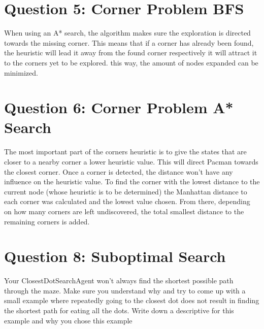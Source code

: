 \documentclass[onecolumn]{article}
\begin{document}
	\section{Question 5: Corner Problem BFS}
	When using an A* search, the algorithm makes sure the exploration is directed towards the missing corner. This means that if a corner has already been found, the heuristic will lead it away from the found corner respectively it will attract it to the corners yet to be explored. this way, the amount of nodes expanded can be minimized.
	
		
	\section{Question 6: Corner Problem A* Search}	
	The most important part of the corners heuristic is to give the states that are closer to a nearby corner a lower heuristic value. This will direct Pacman towards the closest corner. Once a corner is detected, the distance won't have any influence on the heuristic value. To find the corner with the lowest distance to the current node (whose heuristic is to be determined) the Manhattan distance to each corner was calculated and the lowest value chosen. From there, depending on how many corners are left undiscovered, the total smallest distance to the remaining corners is added.
	
	\section{Question 8: Suboptimal Search}
	Your ClosestDotSearchAgent won’t always find the shortest possible path through the maze. Make sure you understand why and try to come up with a small example where repeatedly going to the closest dot does not result in finding the shortest path for eating all the dots. Write down a descriptive for this example and why you chose this example
	
\end{document}
